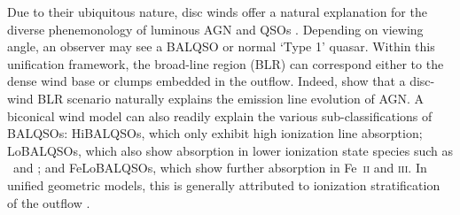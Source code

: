 \documentclass[useAMS,usenatbib]{mn2e_x}
\begin{document}
Due to their ubiquitous nature,
disc winds offer a natural explanation for the
diverse phenemonology of luminous AGN and QSOs \citep[e.g.][]{MCGV95, elvis2000}. 
Depending on viewing angle, an observer 
may see a BALQSO or normal `Type 1' quasar.
Within this unification framework, the broad-line region (BLR) can 
correspond either to the dense wind base or clumps embedded
in the outflow. Indeed, \cite{elitzur2014} show that a disc-wind BLR scenario
naturally explains the emission line evolution of AGN.
A biconical wind model can also readily explain the various sub-classifications of BALQSOs: 
HiBALQSOs, which only exhibit high ionization line absorption; LoBALQSOs, which also show
absorption in lower ionization state species such as \mg\ and \al; and
FeLoBALQSOs, which show further absorption in Fe~\textsc{ii} and \textsc{iii}.
In unified geometric models, this is generally attributed to ionization stratification
of the outflow \citep[e.g.][]{elvis2000}.

\end{document}
